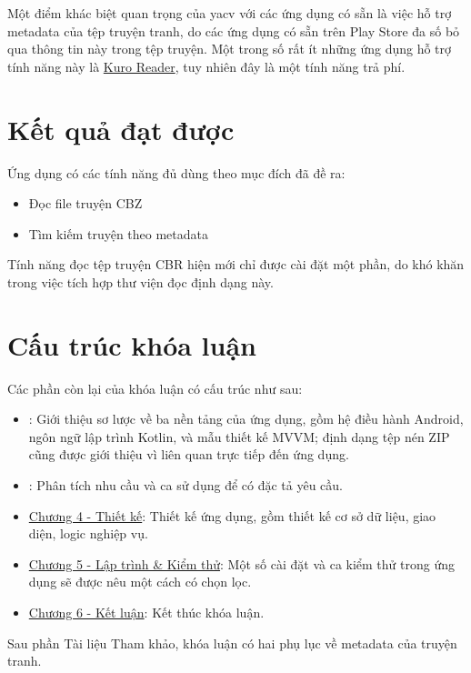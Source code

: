 \documentclass[../../thesis]{subfiles}
\begin{document}
Một điểm khác biệt quan trọng của yacv với các ứng dụng có sẵn là việc hỗ trợ
metadata của tệp truyện tranh, do các ứng dụng có sẵn trên Play Store đa số bỏ
qua thông tin này trong tệp truyện. Một trong số rất ít những ứng dụng hỗ trợ
tính năng này là \href{\KuroReader}{Kuro Reader}, tuy nhiên đây là một tính năng
trả phí.



\section{Kết quả đạt được}\label{sec:resulted-app}

Ứng dụng có các tính năng đủ dùng theo mục đích đã đề ra:

\begin{itemize}
    \item
        Đọc file truyện CBZ
    \item
        Tìm kiếm truyện theo metadata
\end{itemize}

Tính năng đọc tệp truyện CBR hiện mới chỉ được cài đặt một phần, do khó khăn
trong việc tích hợp thư viện đọc định dạng này.



\section{Cấu trúc khóa luận}\label{sec:outline}

Các phần còn lại của khóa luận có cấu trúc như sau:

\begin{itemize}
    \item
        : Giới thiệu sơ lược về ba nền tảng của ứng
        dụng, gồm hệ điều hành Android, ngôn ngữ lập trình Kotlin, và mẫu thiết
        kế MVVM; định dạng tệp nén ZIP cũng được giới thiệu vì liên quan trực
        tiếp đến ứng dụng.
    \item
        : Phân tích nhu cầu và ca sử dụng để có đặc
        tả yêu cầu.
    \item
        \protect\hyperlink{P4-design}{Chương 4 - Thiết kế}: Thiết kế ứng dụng,
        gồm thiết kế cơ sở dữ liệu, giao diện, logic nghiệp vụ.
    \item
        \protect\hyperlink{P5-implementation}{Chương 5 - Lập trình \& Kiểm thử}:
        Một số cài đặt và ca kiểm thử trong ứng dụng sẽ được nêu một cách có
        chọn lọc.
    \item
        \protect\hyperlink{P6-comclusion}{Chương 6 - Kết luận}: Kết thúc khóa
        luận.
\end{itemize}

Sau phần Tài liệu Tham khảo, khóa luận có hai phụ lục về metadata của truyện
tranh.
\end{document}
